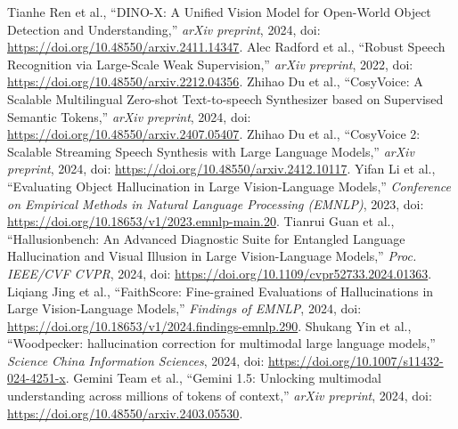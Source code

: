  Tianhe Ren et al., ``DINO-X: A Unified Vision Model for Open-World Object Detection and Understanding,'' \emph{arXiv preprint}, 2024, doi: \url{https://doi.org/10.48550/arxiv.2411.14347}.
 Alec Radford et al., ``Robust Speech Recognition via Large-Scale Weak Supervision,'' \emph{arXiv preprint}, 2022, doi: \url{https://doi.org/10.48550/arxiv.2212.04356}.
 Zhihao Du et al., ``CosyVoice: A Scalable Multilingual Zero-shot Text-to-speech Synthesizer based on Supervised Semantic Tokens,'' \emph{arXiv preprint}, 2024, doi: \url{https://doi.org/10.48550/arxiv.2407.05407}.
 Zhihao Du et al., ``CosyVoice 2: Scalable Streaming Speech Synthesis with Large Language Models,'' \emph{arXiv preprint}, 2024, doi: \url{https://doi.org/10.48550/arxiv.2412.10117}.
 Yifan Li et al., ``Evaluating Object Hallucination in Large Vision-Language Models,'' \emph{Conference on Empirical Methods in Natural Language Processing (EMNLP)}, 2023, doi: \url{https://doi.org/10.18653/v1/2023.emnlp-main.20}.
 Tianrui Guan et al., ``Hallusionbench: An Advanced Diagnostic Suite for Entangled Language Hallucination and Visual Illusion in Large Vision-Language Models,'' \emph{Proc. IEEE/CVF CVPR}, 2024, doi: \url{https://doi.org/10.1109/cvpr52733.2024.01363}.
 Liqiang Jing et al., ``FaithScore: Fine-grained Evaluations of Hallucinations in Large Vision-Language Models,'' \emph{Findings of EMNLP}, 2024, doi: \url{https://doi.org/10.18653/v1/2024.findings-emnlp.290}.
 Shukang Yin et al., ``Woodpecker: hallucination correction for multimodal large language models,'' \emph{Science China Information Sciences}, 2024, doi: \url{https://doi.org/10.1007/s11432-024-4251-x}.
 Gemini Team et al., ``Gemini 1.5: Unlocking multimodal understanding across millions of tokens of context,'' \emph{arXiv preprint}, 2024, doi: \url{https://doi.org/10.48550/arxiv.2403.05530}.
